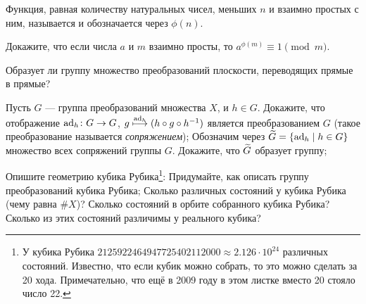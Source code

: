 \documentclass[a4paper,12pt]{article}
\begin{document}
Функция, равная количеству натуральных чисел, меньших $n$ и взаимно простых с ним, называется  и обозначается через $\phi(n)$.

Докажите, что если числа $a$ и $m$ взаимно просты, то $a^{\phi(m)} \equiv 1\pmod{m}$.

Образует ли группу множество преобразований плоскости, переводящих прямые в прямые?

Пусть $G$ --- группа преобразований множества $X$, и $h\in G$.
Докажите, что отображение $\operatorname{ad}_h \colon G \rightarrow G$, $g\stackrel{\operatorname{ad}_h}{\longmapsto} (h\circ g\circ h^{-1})$ является преобразованием $G$ (такое преобразование называется \emph{сопряжением});
Обозначим через $\widetilde{G} = \left\{\operatorname{ad}_h\mid h\in G\right\}$ множество всех сопряжений группы $G$. Докажите, что $\widetilde{G}$ образует группу;


Опишите геометрию кубика Рубика\footnote{У кубика Рубика $2 125 922 464 947 725 402 112 000 \approx 2.126\cdot 10^{24}$ различных состояний. Известно, что если кубик можно собрать, то это можно сделать за 20 хода. Примечательно, что ещё в 2009 году в этом листке вместо 20 стояло число 22.}:
Придумайте, как описать группу преобразований кубика Рубика;
Сколько различных состояний у кубика Рубика (чему равна $\#X$)?
Сколько состояний в орбите собранного кубика Рубика?
Сколько из этих состояний различимы у реального кубика?


\end{document}
